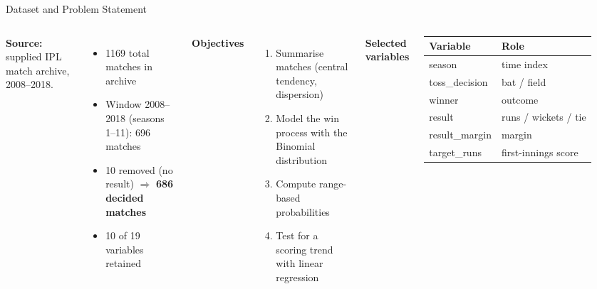 \documentclass[aspectratio=169]{beamer}
\begin{document}
\begin{frame}{Dataset and Problem Statement}
\begin{columns}[T]
\textbf{Source:} supplied IPL match archive, 2008--2018.
\begin{itemize}
\setlength\itemsep{0.35em}
\item 1169 total matches in archive
\item Window 2008--2018 (seasons 1--11): 696 matches
\item 10 removed (no result) $\Rightarrow$ \textbf{686 decided matches}
\item 10 of 19 variables retained
\end{itemize}
\vspace{0.25em}
\textbf{Objectives}
\small
\begin{enumerate}
\setlength\itemsep{0.1em}
\item Summarise matches (central tendency, dispersion)
\item Model the win process with the Binomial distribution
\item Compute range-based probabilities
\item Test for a scoring trend with linear regression
\end{enumerate}
\normalsize

\centering
\small \textbf{Selected variables}
\begin{tabular}{ll}
\toprule
Variable & Role\\
\midrule
season & time index\\
toss\_decision & bat / field\\
winner & outcome\\
result & runs / wickets / tie\\
result\_margin & margin\\
target\_runs & first-innings score\\
\bottomrule
\end{tabular}
\end{columns}
\end{frame}
\end{document}
